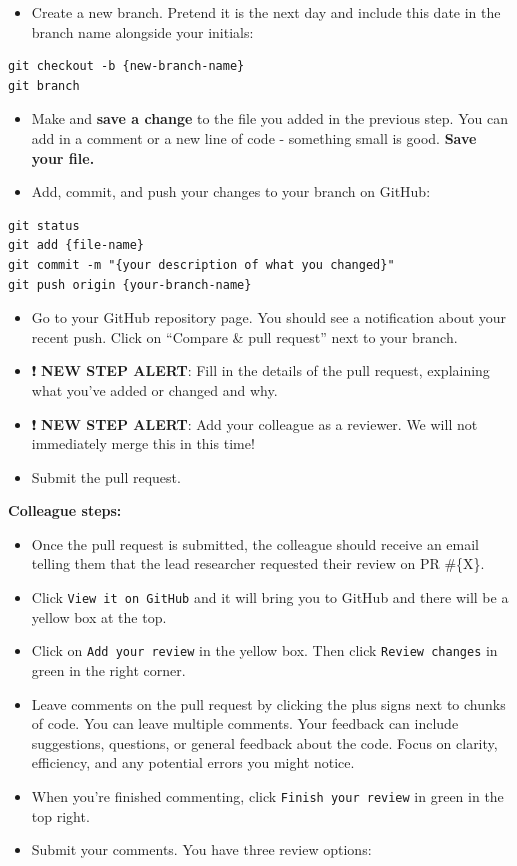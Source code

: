 \documentclass[
]{book}
\providecommand{\tightlist}{%
  \setlength{\itemsep}{0pt}\setlength{\parskip}{0pt}}
\begin{document}
\begin{itemize}
\tightlist
\item
  Create a new branch. Pretend it is the next day and include this date in the
  branch name alongside your initials:
\end{itemize}

\begin{verbatim}
git checkout -b {new-branch-name}
git branch
\end{verbatim}

\begin{itemize}
\tightlist
\item
  Make and \textbf{save a change} to the file you added in the previous step.
  You can add in a comment or a new line of code - something small is good. \textbf{Save
  your file.}
\item
  Add, commit, and push your changes to your branch on GitHub:
\end{itemize}

\begin{verbatim}
git status
git add {file-name}
git commit -m "{your description of what you changed}"
git push origin {your-branch-name}
\end{verbatim}

\begin{itemize}
\tightlist
\item
  Go to your GitHub repository page. You should see a notification about your
  recent push. Click on ``Compare \& pull request'' next to your branch.
\item
  ❗ \textbf{NEW STEP ALERT}: Fill in the details of the pull
  request, explaining what you've added or changed and why.
\item
  ❗ \textbf{NEW STEP ALERT}: Add your colleague as a
  reviewer. We will not immediately merge this in this time!
\item
  Submit the pull request.
\end{itemize}

\textbf{Colleague steps:}

\begin{itemize}
\tightlist
\item
  Once the pull request is submitted, the colleague should receive an email telling them
  that the lead researcher requested their review on PR \#\{X\}.
\item
  Click \texttt{View\ it\ on\ GitHub} and it will bring you to GitHub and there will be a
  yellow box at the top.
\item
  Click on \texttt{Add\ your\ review} in the yellow box. Then click \texttt{Review\ changes} in green in the right corner.
\item
  Leave comments on the pull request by clicking the plus signs next to chunks
  of code. You can leave multiple comments. Your feedback can include suggestions,
  questions, or general feedback about the code. Focus on clarity, efficiency, and
  any potential errors you might notice.
\item
  When you're finished commenting, click \texttt{Finish\ your\ review} in green in the top right.
\item
  Submit your comments. You have three review options:
\end{itemize}
\end{document}
